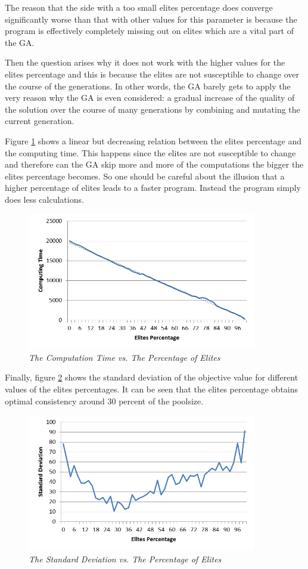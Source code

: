 \par 
The reason that the side with a too small elites percentage does converge significantly worse than that with other values for this parameter is because the program is effectively completely missing out on elites which are a vital part of the GA.
\par 
Then the question arises why it does not work with the higher values for the elites percentage and this is because the elites are not susceptible to change over the course of the generations. In other words, the GA barely gets to apply the very reason why the GA is even considered: a gradual increase of the quality of the solution over the course of many generations by combining and mutating the current generation.
\par
Figure \ref{CTEP} shows a linear but decreasing relation between the elites percentage and the computing time. This happens since the elites are not susceptible to change and therefore can the GA skip more and more of the computations the bigger the elites percentage becomes. So one should be careful about the illusion that a higher percentage of elites leads to a faster program. Instead the program simply does less calculations.

\begin{figure}[h] 
	\centering
	\includegraphics[height=6cm]{CTEP}
	\caption{\textsl{The Computation Time vs. The Percentage of Elites}}
	\label{CTEP}
\end{figure}

Finally, figure \ref{SDEP} shows the standard deviation of the objective value for different values of the elites percentages. It can be seen that the elites percentage obtains optimal consistency around 30 percent of the poolsize.

\begin{figure}[h] 
	\centering
	\includegraphics[height=6cm]{SDEP}
	\caption{\textsl{The Standard Deviation vs. The Percentage of Elites}}
	\label{SDEP}
\end{figure}




